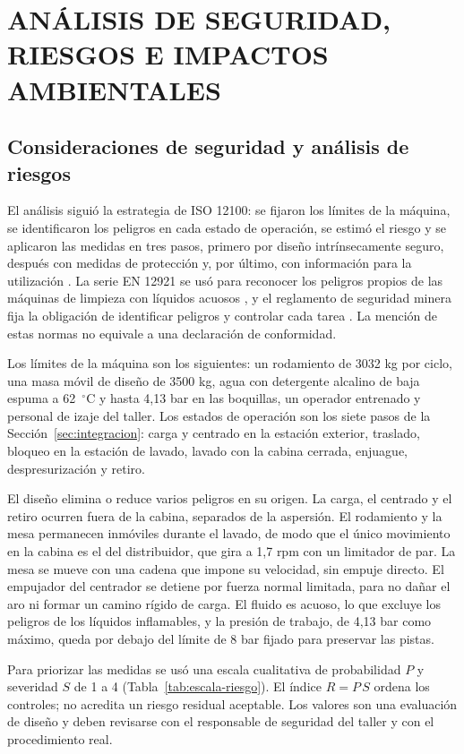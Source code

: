 \chapter{ANÁLISIS DE SEGURIDAD, RIESGOS E IMPACTOS AMBIENTALES}
\label{cap:seguridad-ambiente}

\section{Consideraciones de seguridad y análisis de riesgos}

El análisis siguió la estrategia de ISO 12100: se fijaron los límites de la máquina, se identificaron los peligros en cada estado de operación, se estimó el riesgo y se aplicaron las medidas en tres pasos, primero por diseño intrínsecamente seguro, después con medidas de protección y, por último, con información para la utilización \cite{iso12100}. La serie EN 12921 se usó para reconocer los peligros propios de las máquinas de limpieza con líquidos acuosos \cite{en12921_1,en12921_2}, y el reglamento de seguridad minera fija la obligación de identificar peligros y controlar cada tarea \cite{ds024}. La mención de estas normas no equivale a una declaración de conformidad.

Los límites de la máquina son los siguientes: un rodamiento de 3032 kg por ciclo, una masa móvil de diseño de 3500 kg, agua con detergente alcalino de baja espuma a 62~$^\circ$C y hasta 4,13 bar en las boquillas, un operador entrenado y personal de izaje del taller. Los estados de operación son los siete pasos de la Sección~\ref{sec:integracion}: carga y centrado en la estación exterior, traslado, bloqueo en la estación de lavado, lavado con la cabina cerrada, enjuague, despresurización y retiro.

El diseño elimina o reduce varios peligros en su origen. La carga, el centrado y el retiro ocurren fuera de la cabina, separados de la aspersión. El rodamiento y la mesa permanecen inmóviles durante el lavado, de modo que el único movimiento en la cabina es el del distribuidor, que gira a 1,7 rpm con un limitador de par. La mesa se mueve con una cadena que impone su velocidad, sin empuje directo. El empujador del centrador se detiene por fuerza normal limitada, para no dañar el aro ni formar un camino rígido de carga. El fluido es acuoso, lo que excluye los peligros de los líquidos inflamables, y la presión de trabajo, de 4,13 bar como máximo, queda por debajo del límite de 8 bar fijado para preservar las pistas.

Para priorizar las medidas se usó una escala cualitativa de probabilidad $P$ y severidad $S$ de 1 a 4 (Tabla~\ref{tab:escala-riesgo}). El índice $R=P\,S$ ordena los controles; no acredita un riesgo residual aceptable. Los valores son una evaluación de diseño y deben revisarse con el responsable de seguridad del taller y con el procedimiento real.

